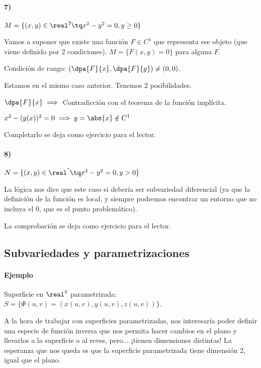 \paragraph{7)} $M = \{(x,y) \in \real^2 \tq x^2-y^2 = 0, y\ge 0\}$

Vamos a suponer que existe una función $F \in C^1$ que representa ese objeto (que viene definido por 2 condiciones). $M = \{F(x,y) = 0\}$ para alguna $F$.

Condición de rango: $\left(\dpa{F}{x},\dpa{F}{y}\right) \neq (0,0)$.

Estamos en el mismo caso anterior. Tenemos 2 posibilidades.

 $\dpa{F}{x} \implies $ Contradicción con el teorema de la función implícita.
 
 $x^2 - (y(x))^2 = 0 \implies y = \abs{x} \notin C^1$
 
 Completarlo se deja como ejercicio para el lector.

\paragraph{8)}

$N = \{(x,y)\in \real^" \tq x^2-y^2 = 0, y>0\}$

La lógica nos dice que este caso si debería ser subvariedad diferencial (ya que la definición de la función es local, y siempre podremos encontrar un entorno que no incluya el 0, que es el punto problemático).

La comprobación se deja como ejercicio para el lector.

\subsection{Subvariedades y parametrizaciones}
\paragraph{Ejemplo} Superficie en $\real^3$ parametrizada: $S = \{\Phi(u,v) = (x(u,v),y(u,v),z(u,v))\}$.

A la hora de trabajar con superficies parametrizadas, nos interesaría poder definir una especie de función inversa que nos permita hacer cambios en el plano y llevarlos a la superficie o al reves, pero... ¡tienen dimensiones distintas! La esperanza que nos queda es que la superficie parametrizada tiene dimensión 2, igual que el plano.


